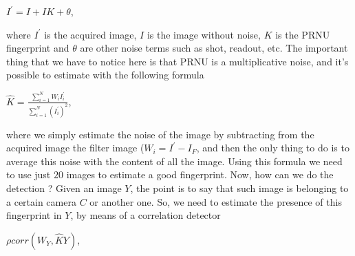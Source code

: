 \documentclass[11pt]{article}
\begin{document}
\begin{center}
$I^{'} = I + IK + \theta$,
\end{center}
where $I^{'}$ is the acquired image, $I$ is the image without noise, $K$ is the PRNU fingerprint and $\theta$ are other noise terms such as shot, readout, etc. The important thing that we have to notice here is that PRNU is a multiplicative noise, and it's possible to estimate with the following formula 

\begin{center}
$\hat{K} = \frac{\sum_{i = 1}^{N} W_{i} I_{i}^{'}}{\sum_{i = 1}^{N} (I_{i}^{'})^{2}}$,
\end{center}

where we simply estimate the noise of the image by subtracting from the acquired image the filter image ($W_{i} = I^{'} - I_{F}$, and then the only thing to do is to average this noise with the content of all the image. Using this formula we need to use just $20$ images to estimate a good fingerprint. Now, how can we do the detection ? Given an image $Y$, the point is to say that such image is belonging to a certain camera $C$ or another one. So, we need to estimate the presence of this fingerprint in $Y$, by means of a correlation detector

\begin{center}
$\rho corr(W_{Y}, \hat{K}Y)$,
\end{center}
\end{document}
